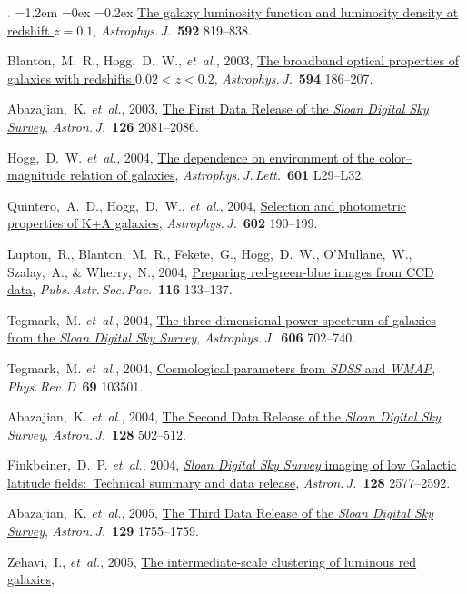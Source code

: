 \documentclass[10pt,letterpaper]{article}
\newcommand{\acronym}[1]{{\small{#1}}}
\newcommand{\foreign}[1]{\textsl{#1}}
\newcommand{\etal}{\foreign{et~al.}}
\newcommand{\project}[1]{\textsl{#1}}
\newcommand{\doi}[2]{\href{http://dx.doi.org/#1}{{#2}}}
\newcommand{\deemph}[1]{\textcolor{grey}{\footnotesize{#1}}}
\newcommand{\pubnumber}[1]{\deemph{{#1}.}}
\newcounter{refpubnum}
\newcommand{\hogglist}{%
    \rightmargin=0in
    \leftmargin=1.2em
    \topsep=0ex
    \partopsep=0pt
    \itemsep=0.2ex
    \parsep=0pt
    \itemindent=-1.0\leftmargin
    \listparindent=0.0\leftmargin
    \settowidth{\labelsep}{~}
    \usecounter{refpubnum}
  }
\begin{document}
\begin{list}{\pubnumber{\therefpubnum}}{\hogglist}
\doi{10.1086/375776}{The galaxy luminosity function and luminosity density at redshift $z=0.1$},
\textit{Astrophys.\,J.}\ \textbf{592} 819--838.
\item
Blanton,~M.~R., Hogg,~D.~W., \etal, 2003,
\doi{10.1086/375528}{The broadband optical properties of galaxies with redshifts $0.02<z<0.2$},
\textit{Astrophys.\,J.}\ \textbf{594} 186--207.
\item
Abazajian,~K. \etal, 2003,
\doi{10.1086/378165}{The First Data Release of the \project{Sloan Digital Sky Survey}},
\textit{Astron.\,J.}\ \textbf{126} 2081--2086.
\item\label{pub:Hogg2004}
Hogg,~D.~W. \etal, 2004,
\doi{10.1086/381749}{The dependence on environment of the color--magnitude relation of galaxies},
\textit{Astrophys.\,J.\,Lett.}\ \textbf{601} L29--L32.
\item\label{pub:Quintero2004}
Quintero,~A.~D., Hogg,~D.~W., \etal, 2004,
\doi{10.1086/380601}{Selection and photometric properties of K+A galaxies},
\textit{Astrophys.\,J.}\ \textbf{602} 190--199.
\item
Lupton,~R., Blanton,~M.~R., Fekete,~G., Hogg,~D.~W., O'Mullane,~W., Szalay,~A., \& Wherry,~N., 2004,
\doi{10.1086/382245}{Preparing red-green-blue images from \acronym{CCD} data},
\textit{Pubs.\,Astr.\,Soc.\,Pac.}\ \textbf{116} 133--137.
\item
Tegmark,~M. \etal, 2004,
\doi{10.1086/382125}{The three-dimensional power spectrum of galaxies from the \project{Sloan Digital Sky Survey}},
\textit{Astrophys.\,J.}\ \textbf{606} 702--740.
\item
Tegmark,~M. \etal, 2004,
\doi{10.1103/PhysRevD.69.103501}{Cosmological parameters from \project{\acronym{SDSS}} and \project{\acronym{WMAP}}},
\textit{Phys.\,Rev.\,D}\ \textbf{69} 103501.
\item
Abazajian,~K. \etal, 2004,
\doi{10.1086/421365}{The Second Data Release of the \project{Sloan Digital Sky Survey}},
\textit{Astron.\,J.}\ \textbf{128} 502--512.
\item
Finkbeiner,~D.~P. \etal, 2004,
\doi{10.1086/425050}{\project{Sloan Digital Sky Survey} imaging of low Galactic latitude fields:\ Technical summary and data release},
\textit{Astron.\,J.}\ \textbf{128} 2577--2592.
\item
Abazajian,~K. \etal, 2005,
\doi{10.1086/427544}{The Third Data Release of the \project{Sloan Digital Sky Survey}},
\textit{Astron.\,J.}\ \textbf{129} 1755--1759.
\item
Zehavi,~I., \etal, 2005,
\doi{10.1086/427495}{The intermediate-scale clustering of luminous red galaxies},

\end{list}
\end{document}

